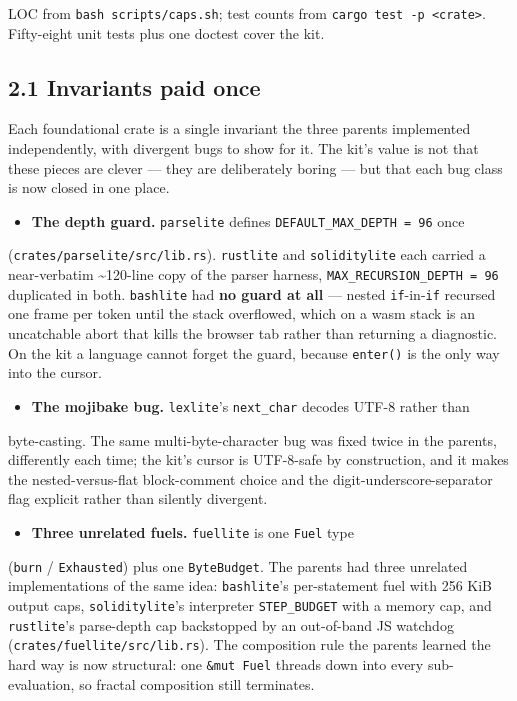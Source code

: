 \documentclass[11pt]{article}
\newcommand{\code}[1]{\texttt{#1}}
\begin{document}
LOC from \code{bash scripts/caps.sh}; test counts from \code{cargo test -p <crate>}.
Fifty-eight unit tests plus one doctest cover the kit.

\subsection*{2.1 Invariants paid once}

Each foundational crate is a single invariant the three parents implemented
independently, with divergent bugs to show for it. The kit's value is not that
these pieces are clever --- they are deliberately boring --- but that each bug class
is now closed in one place.

\begin{itemize}[leftmargin=*]
\item \textbf{The depth guard.} \code{parselite} defines \code{DEFAULT\_MAX\_DEPTH = 96} once
\end{itemize}
  (\code{crates/parselite/src/lib.rs}). \code{rustlite} and \code{soliditylite} each carried a
  near-verbatim \textasciitilde{}120-line copy of the parser harness, \code{MAX\_RECURSION\_DEPTH = 96}
  duplicated in both. \code{bashlite} had \textbf{no guard at all} --- nested \code{if}-in-\code{if}
  recursed one frame per token until the stack overflowed, which on a wasm
  stack is an uncatchable abort that kills the browser tab rather than
  returning a diagnostic. On the kit a language cannot forget the guard,
  because \code{enter()} is the only way into the cursor.

\begin{itemize}[leftmargin=*]
\item \textbf{The mojibake bug.} \code{lexlite}'s \code{next\_char} decodes UTF-8 rather than
\end{itemize}
  byte-casting. The same multi-byte-character bug was fixed twice in the
  parents, differently each time; the kit's cursor is UTF-8-safe by
  construction, and it makes the nested-versus-flat block-comment choice and
  the digit-underscore-separator flag explicit rather than silently divergent.

\begin{itemize}[leftmargin=*]
\item \textbf{Three unrelated fuels.} \code{fuellite} is one \code{Fuel} type
\end{itemize}
  (\code{burn} / \code{Exhausted}) plus one \code{ByteBudget}. The parents had three unrelated
  implementations of the same idea: \code{bashlite}'s per-statement fuel with 256
  KiB output caps, \code{soliditylite}'s interpreter \code{STEP\_BUDGET} with a memory
  cap, and \code{rustlite}'s parse-depth cap backstopped by an out-of-band JS
  watchdog (\code{crates/fuellite/src/lib.rs}). The composition rule the parents
  learned the hard way is now structural: one \code{\&mut Fuel} threads down into
  every sub-evaluation, so fractal composition still terminates.
\end{document}

